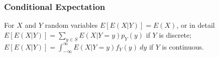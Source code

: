 \subsubsection*{Conditional Expectation}
 For $X$ and $Y$ random variables $E[E(X|Y)] = E(X)$, or in detail $E[E(X|Y)] = \sum_{y \in S} E(X|Y=y)p_Y(y)$ if $Y$ is discrete; $E[E(X|Y)] = \int^{\infty}_{-\infty} E(X|Y=y)f_Y(y)\ dy$ if $Y$ is continuous.